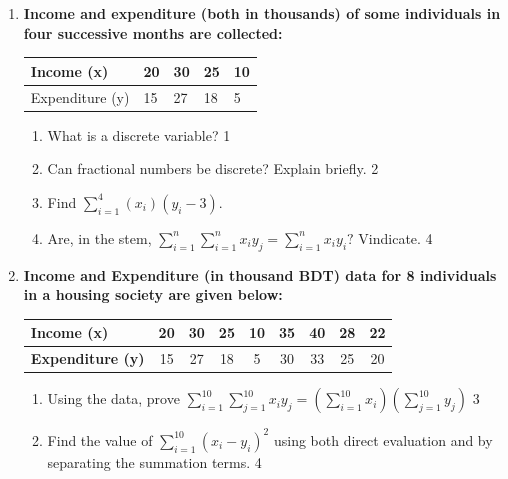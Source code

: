 \documentclass[a4paper,oneside]{book}
\begin{document}
\begin{enumerate}
  \item
  \textbf{Income and expenditure (both in thousands) of some individuals in four successive months are collected:}
 
\begin{table}[h]
 \begin{center}
\begin{tabular}{l|l|l|l|l}

Income (x)  & 20 & 30 & 25 & 10 \\ \hline
Expenditure (y) & 15  & 27  & 18 & 5 \\ 
\end{tabular}
\end{center}
\end{table}


  \begin{enumerate}
    \item
	What is a discrete variable? \hfill 1
    \item
    	Can fractional numbers be discrete? Explain briefly.  \hfill 2
     	     \item
     	Find $\displaystyle \sum_{i=1}^4 (x_i)(y_i-3)$.
    \item
    	Are, in the stem, $\displaystyle \sum_{i=1}^{n}
    	\sum_{i=1}^{n} x_iy_j = \sum_{i=1}^{n} x_iy_i?$ Vindicate. \hfill 4
  \end{enumerate}
  
  
  \item
\textbf{Income and Expenditure (in thousand BDT) data for 8 individuals in a housing society are given below:}

\begin{table}[h]
\centering
\begin{tabular}{l|cccccccc}
\textbf{Income (x)}       & 20 & 30 & 25 & 10 & 35 & 40 & 28 & 22 \\ \hline
\textbf{Expenditure (y)}  & 15 & 27 & 18 &  5 & 30 & 33 & 25 & 20
\end{tabular}
\end{table}


  \begin{enumerate}
    \item Using the data, prove $\displaystyle \sum_{i=1}^{10} \sum_{j=1}^{10}x_i y_j = (\sum_{i=1}^{10}x_i) (\sum_{j=1}^{10} y_j)$ \hfill 3
     \item Find the value of $\sum_{i=1}^{10} (x_i- y_i)^2$ using both direct evaluation and by separating the summation terms. \hfill 4
  \end{enumerate}


\end{enumerate}
\end{document}
